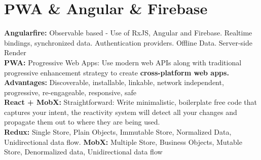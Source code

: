 
\section{PWA \& Angular \& Firebase}
\textcolor{b}{\textbf{Angularfire:}} Observable based - Use of RxJS, Angular and Firebase. Realtime bindings, synchronized data. Authentication providers. Offline Data. Server-side Render\\
\textcolor{b}{\textbf{PWA:}} Progressive Web Apps: Use modern web APIs along with traditional progressive enhancement strategy to create \textbf{cross-platform web apps.} \textbf{Advantages:} Discoverable, installable, linkable, network independent, progressive,
re-engageable, responsive, safe\\
\textcolor{b}{\textbf{React + MobX:}} Straightforward: Write minimalistic, boilerplate free code that captures your intent, the reactivity system will detect all your changes and propagate them out to where they are being used.\\
\textbf{Redux:} Single Store, Plain Objects, Immutable Store, Normalized Data, Unidirectional data flow. \textbf{MobX:} Multiple Store, Business Objects, Mutable Store, Denormalized data, Unidirectional data flow